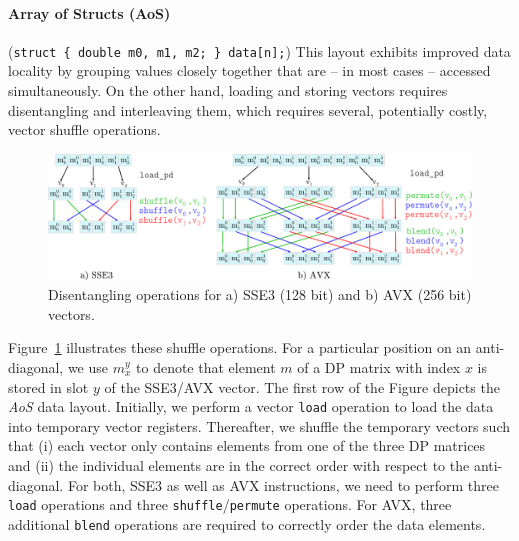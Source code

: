 \documentclass[runningheads,a4paper]{llncs}
\begin{document}
\paragraph*{Array of Structs (AoS)} ({\small\texttt{struct \{ double m0, m1, m2; \}
data[n];}}) This layout exhibits improved data locality by grouping values
closely together that are -- in most cases -- accessed simultaneously. On the
other hand, loading and storing vectors requires disentangling and interleaving
them, which requires several, potentially costly, vector shuffle operations.

\begin{figure}[ht!]
  \centering
  \includegraphics[scale=0.6]{figures/shuffle.pdf}
  \caption{Disentangling operations for a) SSE3 (128 bit) and b) AVX (256 bit) vectors.}
  \label{fig:shufflesse}
\end{figure}

Figure~\ref{fig:shufflesse} illustrates these shuffle operations.
For a particular position on an anti-diagonal, we use $m_x^y$ to denote that element $m$ of a DP matrix with index $x$ 
is stored in slot $y$ of the SSE3/AVX vector.
The first row of the Figure depicts the {\em AoS} data layout.
Initially, we perform a vector \texttt{load} operation
to load the data into temporary vector registers.
Thereafter, we shuffle the temporary vectors such that (i) each vector only contains elements from one of the three DP matrices and
(ii) the individual elements are in the correct order with respect to  the anti-diagonal.
For both, SSE3 as well as AVX instructions, we need to perform three \texttt{load} operations and three \texttt{shuffle}/\texttt{permute} operations.
For AVX, three additional \texttt{blend} operations are required to correctly order the data elements.
\end{document}
